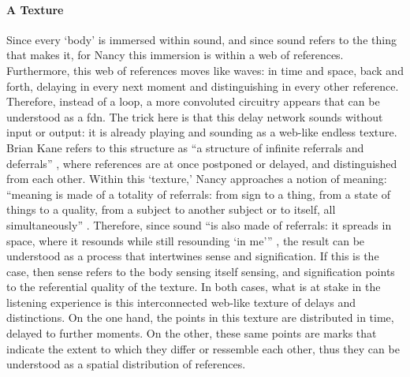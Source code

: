 \paragraph{A Texture}
Since every `body' is immersed within sound, and since sound refers to the thing that makes it, for Nancy this immersion is within a web of references. Furthermore, this web of references moves like waves: in time and space, back and forth, delaying in every next moment and distinguishing in every other reference. Therefore, instead of a loop, a more convoluted circuitry appears that can be understood as a \gls{fdn}. The trick here is that this delay network sounds without input or output: it is already playing and sounding as a web-like endless texture. Brian Kane refers to this structure as ``a structure of infinite referrals and deferrals'' \parencite[143]{Gra15:The}, where references are at once postponed or delayed, and distinguished from each other. Within this `texture,' Nancy approaches a notion of meaning: ``meaning is made of a totality of referrals: from sign to a thing, from a state of things to a quality, from a subject to another subject or to itself, all simultaneously'' \parencite[4-9]{Nan07:Lis}. Therefore, since sound  ``is also made of referrals: it spreads in space, where it resounds while still resounding `in me''' \parencite[4-9]{Nan07:Lis}, the result can be understood as a process that intertwines sense and signification. If this is the case, then sense refers to the body sensing itself sensing, and signification points to the referential quality of the texture. In both cases, what is at stake in the listening experience is this interconnected web-like texture of delays and distinctions. On the one hand, the points in this texture are distributed in time, delayed to further moments. On the other, these same points are marks that indicate the extent to which they differ or ressemble each other, thus they can be understood as a spatial distribution of references. 

